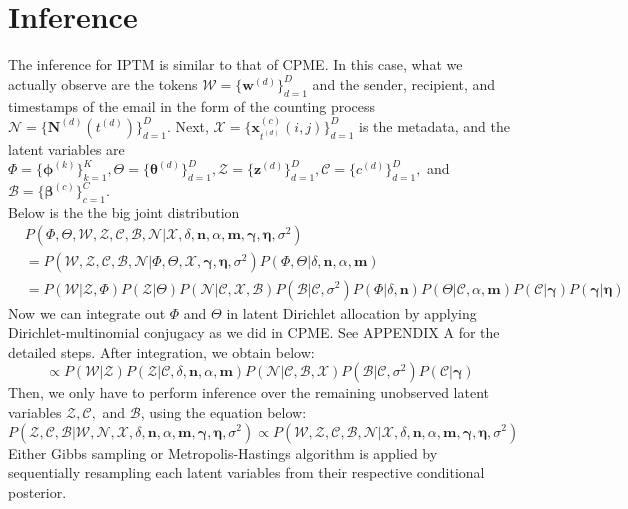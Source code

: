 \documentclass[a4paper]{article}
\begin{document}
\section{Inference}
The inference for IPTM is similar to that of CPME. In this case, what we actually observe are the tokens $\mathcal{W}=\{\boldsymbol{w}^{(d)} \}_{d=1}^{D}$ and the sender, recipient, and timestamps of the email in the form of the counting process $\mathcal{N}=\{\boldsymbol{N}^{(d)}(t^{(d)}) \}_{d=1}^{D}.$ Next,  $\mathcal{X}=\{\boldsymbol{x}^{(c)}_{t^{(d)}}(i, j)\}_{d=1}^{D}$ is the metadata, and the latent variables are $\Phi=\{\boldsymbol{\phi}^{(k)}\}_{k=1}^{K}, \Theta=\{\boldsymbol{\theta}^{(d)} \}_{d=1}^{D}, \mathcal{Z}=\{\boldsymbol{z}^{(d)} \}_{d=1}^{D}, \mathcal{C}=\{{c}^{(d)} \}_{d=1}^{D},$ and $\mathcal{B}=\{\boldsymbol{\beta}^{(c)} \}_{c=1}^{C}$.\\
\newline 
Below is the the big joint distribution
\begin{equation}
\begin{aligned}
& P(\Phi, \Theta, \mathcal{W}, \mathcal{Z}, \mathcal{C}, \mathcal{B}, \mathcal{N}| \mathcal{X}, \delta, \boldsymbol{n}, \alpha, \boldsymbol{m}, \boldsymbol{\gamma}, \boldsymbol{\eta}, \sigma^2) \\& 
=  P(\mathcal{W}, \mathcal{Z}, \mathcal{C}, \mathcal{B}, \mathcal{N}| \Phi, \Theta, \mathcal{X}, \boldsymbol{\gamma}, \boldsymbol{\eta}, \sigma^2) P(\Phi, \Theta |\delta, \boldsymbol{n}, \alpha, \boldsymbol{m})
\\&= P( \mathcal{W}| \mathcal{Z}, \Phi)P(\mathcal{Z}|\Theta)P(\mathcal{N}|\mathcal{C}, \mathcal{X}, \mathcal{B})P(\mathcal{B}|\mathcal{C}, \sigma^2)P(\Phi|\delta, \boldsymbol{n})P(\Theta|\mathcal{C}, \alpha, \boldsymbol{m})P(\mathcal{C}|\boldsymbol{\gamma})P(\boldsymbol{\gamma}|\boldsymbol{\eta})
\end{aligned}
\end{equation}
Now we can integrate out $\Phi$ and $\Theta$ in latent Dirichlet allocation by applying Dirichlet-multinomial conjugacy as we did in CPME. See APPENDIX A for the detailed steps. After integration, we obtain below:
\begin{equation}
\propto P(\mathcal{W}|\mathcal{Z})P( \mathcal{Z}|\mathcal{C}, \delta, \boldsymbol{n}, \alpha, \boldsymbol{m})P(\mathcal{N}|\mathcal{C}, \mathcal{B}, \mathcal{X})P(\mathcal{B}|\mathcal{C}, \sigma^2)P(\mathcal{C}|\boldsymbol{\gamma})
\end{equation}
Then, we only have to perform inference over the remaining unobserved latent variables $\mathcal{Z}, \mathcal{C},$ and $\mathcal{B}$, using the equation below:
\begin{equation}
P( \mathcal{Z}, \mathcal{C}, \mathcal{B}|\mathcal{W}, \mathcal{N}, \mathcal{X}, \delta, \boldsymbol{n}, \alpha, \boldsymbol{m}, \boldsymbol{\gamma}, \boldsymbol{\eta}, \sigma^2) \propto P(\mathcal{W},  \mathcal{Z}, \mathcal{C}, \mathcal{B}, \mathcal{N} | \mathcal{X}, \delta, \boldsymbol{n}, \alpha, \boldsymbol{m}, \boldsymbol{\gamma}, \boldsymbol{\eta}, \sigma^2)
\end{equation}
 Either Gibbs sampling or Metropolis-Hastings algorithm is applied by sequentially resampling each latent variables from their respective conditional posterior.
\end{document}
